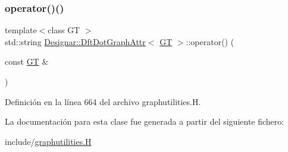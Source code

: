 \subsubsection{\texorpdfstring{operator()()}{operator()()}}
{\footnotesize\ttfamily template$<$class GT $>$ \\
std\+::string \hyperlink{class_designar_1_1_dft_dot_graph_attr}{Designar\+::\+Dft\+Dot\+Graph\+Attr}$<$ \hyperlink{demo-buildgraph_8_c_a3001c40d2c31ca87ed96cd7d1334a55e}{GT} $>$\+::operator() (\begin{DoxyParamCaption}\item[{const \hyperlink{demo-buildgraph_8_c_a3001c40d2c31ca87ed96cd7d1334a55e}{GT} \&}]{ }\end{DoxyParamCaption})\hspace{0.3cm}{\ttfamily [inline]}}



Definición en la línea 664 del archivo graphutilities.\+H.



La documentación para esta clase fue generada a partir del siguiente fichero\+:\begin{DoxyCompactItemize}
\item 
include/\hyperlink{graphutilities_8_h}{graphutilities.\+H}\end{DoxyCompactItemize}
